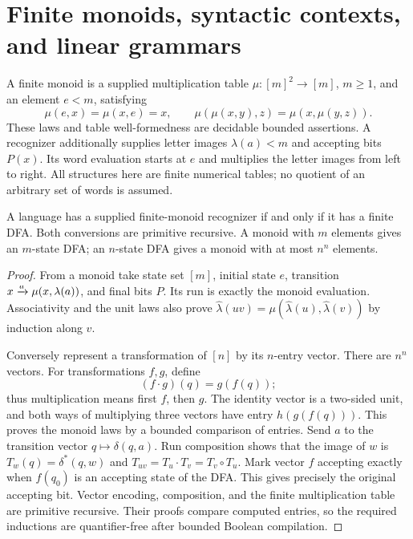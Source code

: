 \section{Finite monoids, syntactic contexts, and linear grammars}
\label{sec:monoids}

A finite monoid is a supplied multiplication table $\mu:[m]^2\to[m]$,
$m\ge1$, and an element $e<m$, satisfying
\[
 \mu(e,x)=\mu(x,e)=x,\qquad
 \mu(\mu(x,y),z)=\mu(x,\mu(y,z)).
\]
These laws and table well-formedness are decidable bounded assertions. A
recognizer additionally supplies letter images $\lambda(a)<m$ and accepting
bits $P(x)$. Its word evaluation starts at $e$ and multiplies the letter
images from left to right. All structures here are finite numerical tables;
no quotient of an arbitrary set of words is assumed.

\begin{theorem}\label{mon:recognition}
A language has a supplied finite-monoid recognizer if and only if it has a
finite DFA. Both conversions are primitive recursive. A monoid with $m$
elements gives an $m$-state DFA; an $n$-state DFA gives a monoid with at most
$n^n$ elements.
\end{theorem}
\begin{proof}
From a monoid take state set $[m]$, initial state $e$, transition
$x\mathrel{\smash{\xrightarrow{a}}}\mu(x,\lambda(a))$, and final bits $P$.
Its run is exactly the monoid evaluation. Associativity and the unit laws
also prove $\widehat\lambda(uv)=\mu(\widehat\lambda(u),\widehat\lambda(v))$
by induction along $v$.

Conversely represent a transformation of $[n]$ by its $n$-entry vector.
There are $n^n$ vectors. For transformations $f,g$, define
\[
 (f\cdot g)(q)=g(f(q));
\]
thus multiplication means first $f$, then $g$. The identity vector is a
two-sided unit, and both ways of multiplying three vectors have entry
$h(g(f(q)))$. This proves the monoid laws by a bounded comparison of entries.
Send $a$ to the transition vector $q\mapsto\delta(q,a)$. Run composition
shows that the image of $w$ is
$T_w(q)=\delta^*(q,w)$ and $T_{uv}=T_u\cdot T_v=T_v\circ T_u$.
Mark vector $f$ accepting exactly when $f(q_0)$ is an accepting state of
the DFA. This gives precisely the original accepting bit. Vector encoding,
composition, and the finite multiplication table are primitive recursive.
Their proofs compare computed entries, so the required inductions are
quantifier-free after bounded Boolean compilation.
\end{proof}

